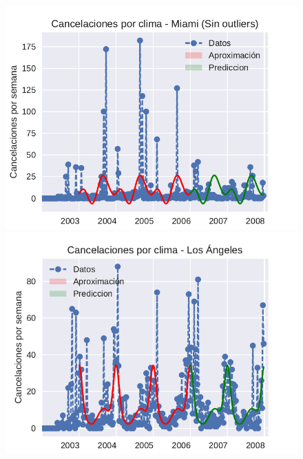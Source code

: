 


\begin{figure}[H]
\centering
\begin{minipage}{.5\textwidth}
  \centering
  \includegraphics[width=1.1\linewidth]{informe/imagenes/cancelacionesClimaMiamiPrediccionV1.pdf}
\end{minipage}%
\begin{minipage}{.5\textwidth}
  \centering
    \includegraphics[width=1.1\linewidth]{informe/imagenes/cancelacionesClimaLosAngelesPrediccionV1.pdf}
\end{minipage}
\end{figure}


